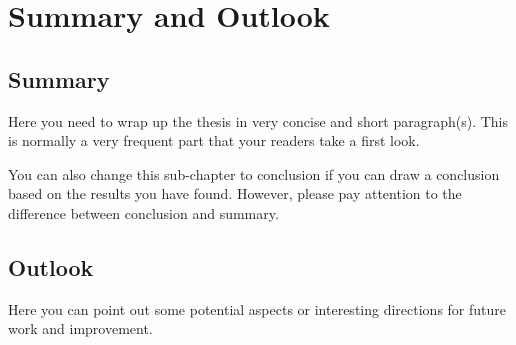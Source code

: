 \chapter{Summary and Outlook}
\label{cp:summary_outlook}

\section{Summary} \label{sec:summary}
Here you need to wrap up the thesis in very concise and short paragraph(s). This is normally a very frequent part that your readers take a first look. 

You can also change this sub-chapter to conclusion if you can draw a conclusion based on the results you have found. However, please pay attention to the difference between conclusion and summary.

\section{Outlook} \label{sec:outlook}

Here you can point out some potential aspects or interesting directions for future work and improvement. 